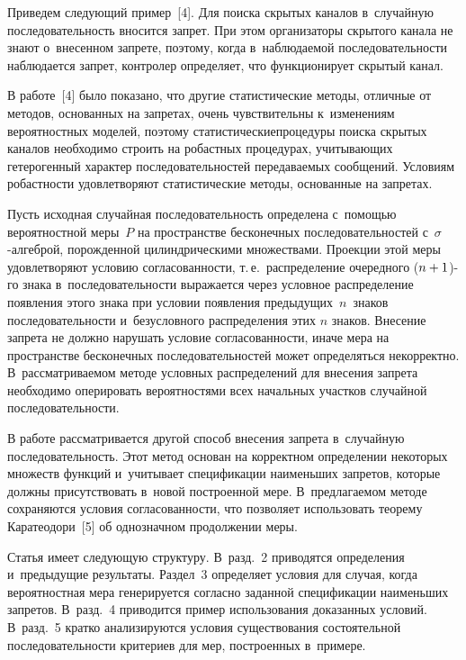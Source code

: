 \begin{multicols}{2}
Приведем следующий пример~[4]. Для поиска скрытых каналов в~случайную
последовательность вносится запрет. При этом организаторы скрытого канала
не знают о~внесенном запрете, поэтому, когда в~наблюдаемой
последовательности наблюдается запрет, контролер определяет, что
функционирует скрытый канал.

    В работе~[4] было показано, что другие статистические методы, отличные
от методов, основанных на запретах, очень чувствительны к~изменениям
вероятностных моделей, поэтому статистические\linebreak процедуры по\-ис\-ка скрытых
каналов необходимо строить на робастных процедурах, учитывающих
гетерогенный характер последовательностей передаваемых сообщений.
Условиям робастности удовле\-тво\-ря\-ют статистические методы, основанные на
запретах.

    Пусть исходная случайная последовательность определена с~помощью
вероятностной меры~$P$ на пространстве бесконечных последовательностей
с~$\sigma$-ал\-геб\-рой, порожденной цилиндрическими множествами.
Проекции этой меры удовлетворяют условию согласованности, т.\,е.\
распределение очередного ($n\hm+1$)-го знака в~последовательности
выражается через условное распределение появления этого знака при условии
появления предыду\-щих~$n$~знаков последовательности и~безусловного
распределения этих $n$ знаков. Внесение запрета не должно нарушать условие
согласованности, иначе мера на пространстве бесконечных
последовательностей может определяться некорректно. В~рассматриваемом
методе условных распределений для внесения запрета необходимо оперировать
вероятностями всех начальных участков случайной последовательности.

    В работе рассматривается другой способ внесения запрета в~случайную
последовательность. Этот метод основан на корректном определении некоторых
множеств функций и~учитывает спе\-ци\-фи\-кации наименьших запретов, которые
должны присутствовать в~новой построенной мере. В~предлагаемом методе
сохраняются условия со\-гла\-со\-ван\-ности, что позволяет использовать теорему
Каратеодори~[5] об однозначном продолжении меры.

  Статья имеет следующую структуру. В~разд.~2 приводятся определения
и~предыдущие результаты. Раздел~3 определяет условия для случая, когда
вероятностная мера генерируется согласно заданной спецификации
наименьших запретов. В~разд.~4 приводится пример использования
доказанных условий. В~разд.~5 кратко анализируются условия существования
состоятельной последовательности критериев для мер, построенных в~примере.


\end{multicols}
